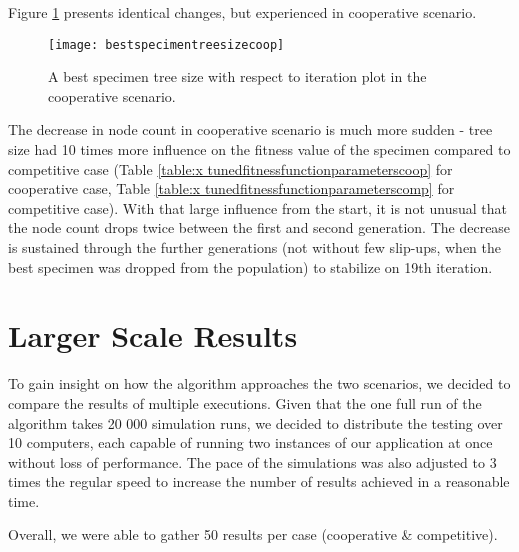 Figure \ref{fig:x cooperativebestspecimentreesizeplot} presents identical changes, but experienced in cooperative scenario.
\begin{figure}[h]
    \centering
    \texttt{[image: bestspecimentreesizecoop]}
    \caption{A best specimen tree size with respect to iteration plot in the cooperative scenario.}
    \label{fig:x cooperativebestspecimentreesizeplot}
\end{figure}
The decrease in node count in cooperative scenario is much more sudden - tree size had 10 times more influence on the fitness value of the specimen compared to competitive case (Table \ref{table:x tunedfitnessfunctionparameterscoop} for cooperative case, Table \ref{table:x tunedfitnessfunctionparameterscomp} for competitive case). With that large influence from the start, it is not unusual that the node count drops twice between the first and second generation. The decrease is sustained through the further generations (not without few slip-ups, when the best specimen was dropped from the population) to stabilize on 19th iteration.
\section{ Larger Scale Results } %
To gain insight on how the algorithm approaches the two scenarios, we decided to compare the results of multiple executions. Given that the one full run of the algorithm takes 20 000 simulation runs, we decided to distribute the testing over 10 computers, each capable of running two instances of our application at once without loss of performance. The pace of the simulations was also adjusted to 3 times the regular speed to increase the number of results achieved in a reasonable time.

Overall, we were able to gather 50 results per case (cooperative \& competitive).
